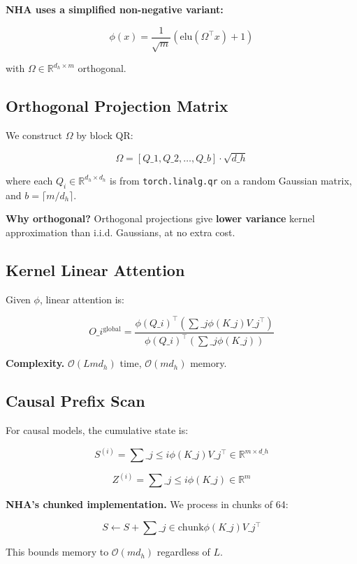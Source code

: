 \textbf{NHA uses a simplified non-negative variant:}

\[
\phi(x) = \frac{1}{\sqrt{m}} (\mathrm{elu}(\Omega^\top x) + 1)
\tag{3.4}
\]

with $\Omega \in \mathbb{R}^{d_h \times m}$ orthogonal.

\subsection{Orthogonal Projection Matrix}

We construct $\Omega$ by block QR:

\[
\Omega = [Q\_1, Q\_2, \ldots, Q\_b] \cdot \sqrt{d\_h}
\tag{3.5}
\]

where each $Q_i \in \mathbb{R}^{d_h \times d_h}$ is from \texttt{torch.linalg.qr} 
on a random Gaussian matrix, and $b = \lceil m / d_h \rceil$.

\textbf{Why orthogonal?} Orthogonal projections give \textbf{lower variance} kernel 
approximation than i.i.d. Gaussians, at no extra cost.

\subsection{Kernel Linear Attention}

Given $\phi$, linear attention is:

\[
O\_i^\text{global} = \frac{\phi(Q\_i)^\top \left(\sum\_j \phi(K\_j) V\_j^\top\right)}{\phi(Q\_i)^\top \left(\sum\_j \phi(K\_j)\right)}
\tag{3.6}
\]

\textbf{Complexity.} $\mathcal{O}(L m d_h)$ time, $\mathcal{O}(m d_h)$ memory.

\subsection{Causal Prefix Scan}

For causal models, the cumulative state is:

\[
S^{(i)} = \sum\_{j \leq i} \phi(K\_j) V\_j^\top \in \mathbb{R}^{m \times d\_h}
\tag{3.7}
\]

\[
Z^{(i)} = \sum\_{j \leq i} \phi(K\_j) \in \mathbb{R}^m
\tag{3.8}
\]

\textbf{NHA's chunked implementation.} We process in chunks of 64:

\[
S \leftarrow S + \sum\_{j \in \text{chunk}} \phi(K\_j) V\_j^\top
\tag{3.9}
\]

This bounds memory to $\mathcal{O}(m d_h)$ regardless of $L$.

